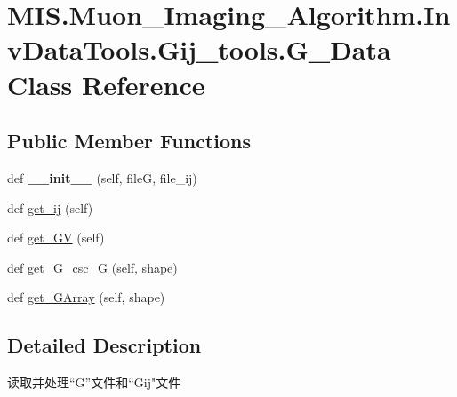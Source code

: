 \hypertarget{classMIS_1_1Muon__Imaging__Algorithm_1_1InvDataTools_1_1Gij__tools_1_1G__Data}{}\section{M\+I\+S.\+Muon\+\_\+\+Imaging\+\_\+\+Algorithm.\+Inv\+Data\+Tools.\+Gij\+\_\+tools.\+G\+\_\+\+Data Class Reference}
\label{classMIS_1_1Muon__Imaging__Algorithm_1_1InvDataTools_1_1Gij__tools_1_1G__Data}
\subsection*{Public Member Functions}
\begin{DoxyCompactItemize}
\item 
\mbox{\label{classMIS_1_1Muon__Imaging__Algorithm_1_1InvDataTools_1_1Gij__tools_1_1G__Data_a7899fd15543eb493bf7ad2f6cad4a2e2}} 
def {\bfseries \+\_\+\+\_\+init\+\_\+\+\_\+} (self, fileG, file\+\_\+ij)
\item 
def \hyperlink{classMIS_1_1Muon__Imaging__Algorithm_1_1InvDataTools_1_1Gij__tools_1_1G__Data_ab866f9c0348d8737e8ea2d09f9057ebb}{get\+\_\+ij} (self)
\item 
def \hyperlink{classMIS_1_1Muon__Imaging__Algorithm_1_1InvDataTools_1_1Gij__tools_1_1G__Data_a720c9b411831229eedc040f73197c4b5}{get\+\_\+\+GV} (self)
\item 
def \hyperlink{classMIS_1_1Muon__Imaging__Algorithm_1_1InvDataTools_1_1Gij__tools_1_1G__Data_a84fff672768d24b9a1326a02366410b2}{get\+\_\+\+G\+\_\+csc\+\_\+G} (self, shape)
\item 
def \hyperlink{classMIS_1_1Muon__Imaging__Algorithm_1_1InvDataTools_1_1Gij__tools_1_1G__Data_a296edb021b7121470824479678192a5b}{get\+\_\+\+G\+Array} (self, shape)
\end{DoxyCompactItemize}


\subsection{Detailed Description}
\begin{DoxyVerb}读取并处理“G”文件和“Gij"文件\end{DoxyVerb}
 

